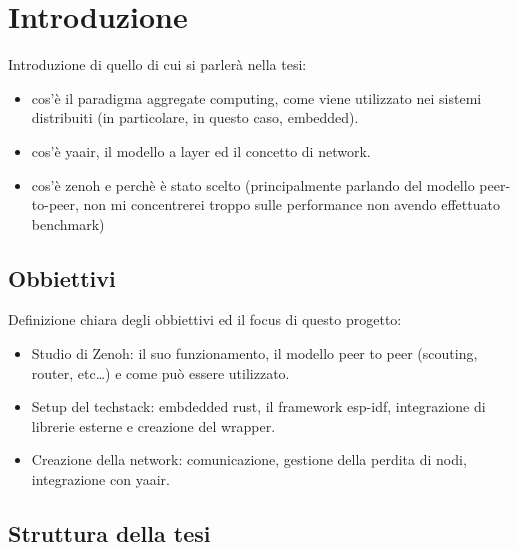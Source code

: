 \chapter{Introduzione}
\label{chap:introduzione}

Introduzione di quello di cui si parlerà nella tesi:
\begin{itemize}
	\item cos'è il paradigma aggregate computing, come viene utilizzato nei sistemi
	distribuiti (in particolare, in questo caso, embedded).
	\item cos'è yaair, il modello a layer ed il concetto di network.
	\item cos'è zenoh e perchè è stato scelto (principalmente parlando del modello
	peer-to-peer, non mi concentrerei troppo sulle performance non avendo effettuato
	benchmark)
\end{itemize}

\section{Obbiettivi}
\label{sec:obbiettivi}

Definizione chiara degli obbiettivi ed il focus di questo progetto:
\begin{itemize}
	\item Studio di Zenoh: il suo funzionamento, il modello peer
	      to peer (scouting, router, etc\dots) e come può essere utilizzato.
	\item Setup del techstack: embdedded rust, il framework esp-idf, integrazione
	      di librerie esterne e creazione del wrapper.
	\item Creazione della network: comunicazione, gestione della perdita di nodi,
	      integrazione con yaair.
\end{itemize}

\section{Struttura della tesi}
\label{sec:struttura-della-tesi}


